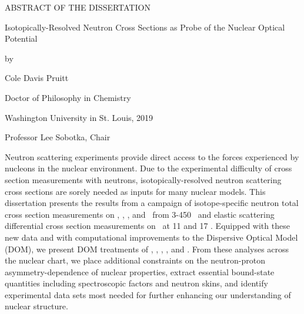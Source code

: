 \thispagestyle{plain}
\begin{center}

    ABSTRACT OF THE DISSERTATION

    Isotopically-Resolved Neutron Cross Sections as
    Probe of the Nuclear Optical Potential

    \vspace{0.5 cm}

    by

    \vspace{0.2 cm}

    Cole Davis Pruitt

    \vspace{0.2 cm}

    Doctor of Philosophy in Chemistry

    \vspace{0.2 cm}

    Washington University in St. Louis, 2019

    \vspace{0.2cm}

    Professor Lee Sobotka, Chair
\end{center}

\vspace{1cm}

Neutron scattering experiments provide direct access to the forces experienced by nucleons in the
nuclear environment. Due to the experimental difficulty of cross section
measurements with neutrons, isotopically-resolved neutron scattering cross sections are sorely
needed as inputs for many nuclear models.
This dissertation presents the results from a campaign of
isotope-specific neutron total cross section measurements on \oSixEight, \niEightFour,
\snTwelveFour, and \rhThree\ from
3-450 \mega\electronvolt\ and elastic scattering differential cross section measurements on
\snTwelveNatFour\ at 11 and 17 \mega\electronvolt. Equipped with these new data and
with computational improvements to the Dispersive Optical Model (DOM),
we present DOM treatments of \oSixEight, \caAughtEight, \niEightFour, 
\snTwelveFour, and \pbEight. From these analyses across the nuclear chart, we place additional 
constraints on the neutron-proton asymmetry-dependence of nuclear properties, extract essential bound-state 
quantities including spectroscopic factors and neutron skins, and identify experimental data sets 
most needed for further enhancing our understanding of nuclear structure.

